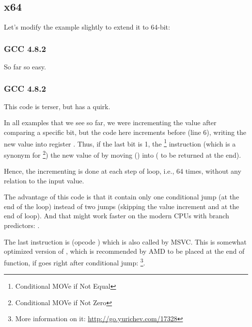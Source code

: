 \subsection{x64}
\label{subsec:popcnt}

Let's modify the example slightly to extend it to 64-bit:



\subsubsection{\NonOptimizing GCC 4.8.2}

So far so easy.



\subsubsection{\Optimizing GCC 4.8.2}



This code is terser, but has a quirk.

In all examples that we see so far, we were incrementing the  value after comparing a specific bit,
but the code here increments  before (line 6), writing the new value into register \EDX .
Thus, if the last bit is 1, the \CMOVNE\footnote{Conditional MOVe if Not Equal} instruction
(which is a synonym for \CMOVNZ\footnote{Conditional MOVe if Not Zero})  
the new value of 
by moving \EDX () into \EAX ( to be returned at the end).

Hence, the incrementing is done at each step of loop, i.e., 64 times, without any relation to the input value.

The advantage of this code is that it contain only one conditional jump (at the end of the loop) instead of 
two jumps (skipping the  value increment and at the end of loop).
And that might work faster on the modern CPUs with branch predictors: .

\label{FATRET}
The last instruction is  (opcode ) 
which is also called  by MSVC.
This is somewhat optimized version of \RET, 
which is recommended by AMD to be placed at the end of function, if \RET goes right after conditional jump: 
\cite[p.15]{AMDOptimization}
\footnote{More information on it: \url{http://go.yurichev.com/17328}}.

